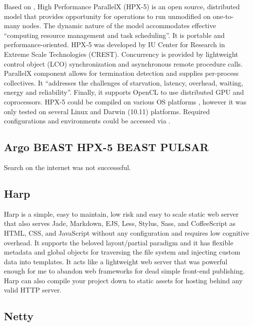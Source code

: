      Based on \cite{www-hpx-5}, High Performance ParallelX (HPX-5)
     is an open source, distributed model that provides opportunity
     for operations to run unmodified on one-to-many nodes. The
     dynamic nature of the model accommodates effective ``computing
     resource management and task scheduling''. It is portable and
     performance-oriented. HPX-5 was developed by IU Center for
     Research in Extreme Scale Technologies (CREST). Concurrency is
     provided by lightweight control object (LCO) synchronization and
     asynchronous remote procedure calls. ParallelX component allows
     for termination detection and supplies per-process
     collectives. It ``addresses the challenges of starvation, latency,
     overhead, waiting, energy and reliability''. Finally, it supports
     OpenCL to use distributed GPU and coprocessors. HPX-5 could be
     compiled on various OS platforms , however it was only tested on
     several Linux and Darwin (10.11) platforms. Required
     configurations and environments could be accessed via
     \cite{www-hpx-5-user-guide}.
	 
	 
\subsection{ Argo BEAST HPX-5 BEAST PULSAR}

     Search on the internet was not successsful.
     
\subsection{ Harp}

     Harp \cite{www-harp} is a simple, easy to maintain, low risk and
     easy to scale static web server that also serves Jade, Markdown,
     EJS, Less, Stylus, Sass, and CoffeeScript as HTML, CSS, and
     JavaScript without any configuration and requires low cognitive
     overhead. It supports the beloved layout/partial paradigm and it
     has flexible metadata and global objects for traversing the file
     system and injecting custom data into templates. It acts like a
     lightweight web server that was powerful enough for me to abandon
     web frameworks for dead simple front-end publishing. Harp can
     also compile your project down to static assets for hosting
     behind any valid HTTP server.
     
\subsection{ Netty}

